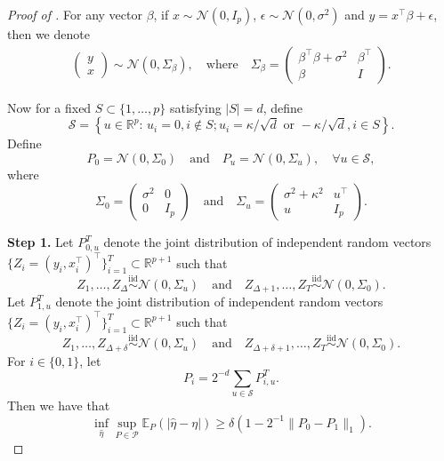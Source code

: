 \documentclass[twoside]{article}
\begin{document}
\begin{proof}[Proof of ]
For any vector $\beta$, if $x \sim \mathcal{N}(0, I_p)$, $\epsilon \sim \mathcal{N}(0, \sigma^2)$ and $y = x^{\top} \beta + \epsilon$, then we denote
	\begin{align*}
		\left(\begin{array}{c} 
			y \\
			x
		\end{array}\right) \sim \mathcal{N}\left(0, \Sigma_\beta\right), \quad \mbox{where}  \quad \Sigma_{\beta} = \left(\begin{array}{cc} 
			\beta^{\top}\beta + \sigma^2 & \beta^{\top} \\
			\beta & I
 		\end{array}\right).
	\end{align*}

Now for a fixed $S \subset \{1, \ldots, p\}$ satisfying $|S| = d$, define
	\[
		\mathcal{S} = \left\{u \in \mathbb{R}^p: \, u_i = 0, i \notin S; u_i = \kappa/\sqrt{d} \mbox{ or } -\kappa/\sqrt{d}, i \in S\right\}.
	\]
	Define 
	\[
		P_0 = \mathcal{N}\left(0, \Sigma_0\right) \quad \mbox{and} \quad P_u = \mathcal{N}\left(0, \Sigma_u\right), \quad \forall u \in \mathcal{S},
	\]
	where 
	\[
		\Sigma_0 = \left(\begin{array}{cc}
			\sigma^2 & 0 \\
			0 & I_p
		 \end{array}\right) \quad \mbox{and} \quad \Sigma_u = \left(\begin{array}{cc}
			\sigma^2 + \kappa^2 & u^{\top} \\
			u & I_p	
		 \end{array}\right).
	\]

\medskip
\noindent \textbf{Step 1.}  Let $P_{0, u}^T$ denote the joint distribution of independent random vectors $\{Z_i = (y_i, x_i^{\top})^{\top}\}_{i = 1}^T \subset \mathbb{R}^{p+1}$ such that
	\[
		Z_1, \ldots, Z_{\Delta} \stackrel{\mbox{iid}}{\sim} \mathcal{N}(0, \Sigma_u) \quad \mbox{and} \quad Z_{\Delta + 1}, \ldots, Z_T \stackrel{\mbox{iid}}{\sim} \mathcal{N}(0, \Sigma_0).
	\] 
	Let $P_{1, u}^T$ denote the joint distribution of independent random vectors $\{Z_i = (y_i, x_i^{\top})^{\top}\}_{i = 1}^T \subset \mathbb{R}^{p+1}$ such that
	\[
		Z_1, \ldots, Z_{\Delta + \delta} \stackrel{\mbox{iid}}{\sim} \mathcal{N}(0, \Sigma_u) \quad \mbox{and} \quad Z_{\Delta + \delta + 1}, \ldots, Z_T \stackrel{\mbox{iid}}{\sim} \mathcal{N}(0, \Sigma_0).
	\] 
	For $i \in \{0, 1\}$, let
	\[
		P_i = 2^{-d} \sum_{u \in \mathcal{S}} P_{i, u}^T.
	\]	
	Then we have that
	\[
		\inf_{\widehat{\eta}} \sup_{P \in \mathcal{P}} \mathbb{E}_P(|\widehat{\eta} - \eta|) \geq \delta (1 - 2^{-1}\|P_0 - P_1\|_1).
	\]


\end{proof}
\end{document}
